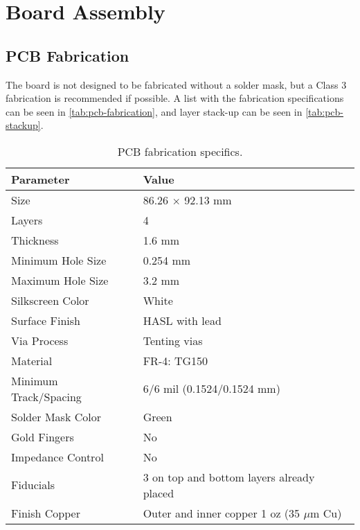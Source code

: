 %
%
%
%
%

%
%
%
%
%
%

\chapter{Board Assembly} \label{ch:assembly}

\section{PCB Fabrication}

The board is not designed to be fabricated without a solder mask, but a Class 3 fabrication is recommended if possible. A list with the fabrication specifications can be seen in \autoref{tab:pcb-fabrication}, and layer stack-up can be seen in \autoref{tab:pcb-stackup}.

\begin{table}[!h]
    \centering
    \begin{tabular}{L{0.5\columnwidth}L{0.5\columnwidth}}
        \toprule[1.5pt]
        \textbf{Parameter}      & \textbf{Value} \\
        \midrule
        Size                    & 86.26 $\times$ 92.13 mm \\
        Layers                  & 4 \\
        Thickness               & 1.6 mm \\
        Minimum Hole Size       & 0.254 mm \\
        Maximum Hole Size       & 3.2 mm \\
        Silkscreen Color        & White \\
        Surface Finish          & HASL with lead \\
        Via Process             & Tenting vias \\
        Material                & FR-4: TG150 \\
        Minimum Track/Spacing   & 6/6 mil (0.1524/0.1524 mm)\\
        Solder Mask Color       & Green \\
        Gold Fingers            & No \\
        Impedance Control       & No \\   
        Fiducials               & 3 on top and bottom layers already placed \\
        Finish Copper           & Outer and inner copper 1 oz (35 $\mu$m Cu) \\
        \bottomrule[1.5pt]
    \end{tabular}
    \caption{PCB fabrication specifics.}
    \label{tab:pcb-fabrication}
\end{table}

